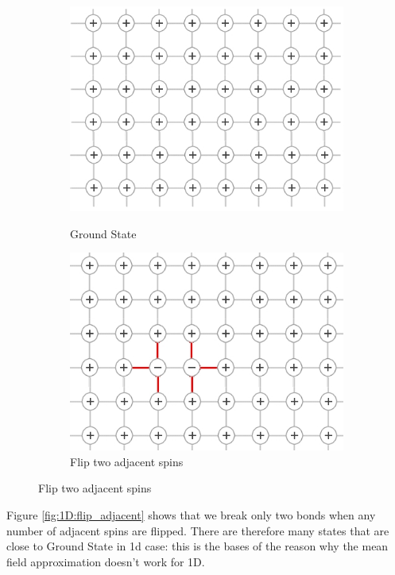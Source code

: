 \documentclass[]{article}
\begin{document}
 \begin{figure}[H]
 	\caption{Two dimensional Ising Model}
 	\begin{subfigure}[b]{0.45\textwidth}
 		\centering
 		\caption{Ground State}
 		\includegraphics[width=\textwidth]{ising2D0}\label{fig:2d:t0}
 	\end{subfigure}
 	\hfill
 	\begin{subfigure}[b]{0.45\textwidth}
 		\centering
 		\caption{Flip two adjacent spins}\label{fig:2d:adjacent}
 		\includegraphics[width=\textwidth]{ising2D2a}
 	\end{subfigure}
 \end{figure}

Figure \ref{fig:1D:flip_adjacent} shows that we break only two bonds when any number of adjacent spins are flipped. There are therefore many states that are close to Ground State in 1d case: this is the bases of the reason why the mean field approximation doesn't work for 1D.
 
\end{document}
